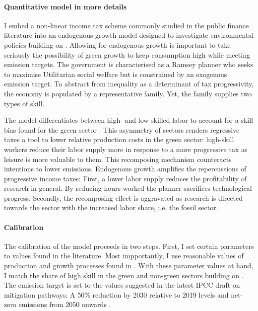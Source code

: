 \paragraph{Quantitative model in more details}
I embed a non-linear income tax scheme commonly studied in the public finance literature \citep[e.g.][]{Heathcote2017OptimalFramework} into an endogenous growth model designed to investigate environmental policies building on \cite{Fried2018ClimateAnalysis}.  
Allowing for endogenous growth is important to take seriously the possibility of green growth to keep consumption high while meeting emission targets.
The government is characterised as a Ramsey planner who seeks to maximise Utilitarian social welfare but is constrained by an exogenous emission target. To abstract from inequality as a determinant of tax progressivity, the economy is populated by a representative family. Yet, the family supplies two types of skill. 

The model differentiates between high- and low-skilled labor to account for a skill bias found for the green sector \citep{Consoli2016DoCapital}. This asymmetry of sectors renders regressive taxes a tool to lower relative production costs in the green sector: high-skill workers reduce their labor supply more in response to a more progressive tax as leisure is more valuable to them. This recomposing mechanism counteracts intentions to lower emissions. %
Endogenous growth amplifies the repercussions of progressive income taxes:
First, a lower labor supply reduces the profitability of research in general. By reducing hours worked the planner sacrifices technological progress. Secondly, the recomposing effect is aggravated as research is directed towards the sector with the increased labor share, i.e. the fossil sector.

\paragraph{Calibration}
The calibration of the model proceeds in two steps. First, I set certain parameters to values found in the literature. Most impportantly, I use reasonable values of production and growth processes found in \cite{Fried2018ClimateAnalysis}. %
With these parameter values at hand, I match the share of high skill in the green and non-green sectors building on \cite{Consoli2016DoCapital}. The emission target is set to the values suggested in the latest IPCC draft on mitigation pathways: A 50\% reduction by 2030 relative to 2019 levels and  net-zero emissions from 2050 onwards \citep{IPCC2022}.

